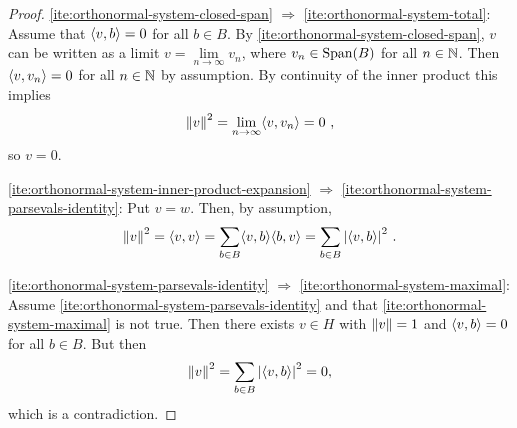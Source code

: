 \begin{proof}
  \ref{ite:orthonormal-system-closed-span}  $\Rightarrow$ \ref{ite:orthonormal-system-total}:
  Assume that $\langle v, b \rangle = 0$ for all $b \in B$. By \ref{ite:orthonormal-system-closed-span}, $v$ can be written as a limit 
  $v = \lim\limits_{n\to\infty} v_n$, where $v_n \in \operatorname{Span} (B)$ for all $n\in \mathbb{N}$. 
  Then  $\langle v, v_n \rangle = 0$ for all $n\in \mathbb{N}$ by assumption. 
  By continuity of the inner product this implies
  \[
     \left\|v\right\|^2 = \lim\limits_{n\to\infty} \langle v, v_n \rangle = 0 \ ,
  \]
  so $v=0$. 

  \ref{ite:orthonormal-system-inner-product-expansion} $\Rightarrow$ \ref{ite:orthonormal-system-parsevals-identity}: 
  Put $v = w$. Then, by assumption,
  \[
   \left\|v\right\|^2 = \langle v, v \rangle = \sum\limits_{b\in B} \langle v, b \rangle \langle b, v \rangle = \sum\limits_{b \in B} {\left|\langle v, b \rangle\right|}^2 \ .
  \]

  \ref{ite:orthonormal-system-parsevals-identity} $\Rightarrow$ \ref{ite:orthonormal-system-maximal}:
  Assume \ref{ite:orthonormal-system-parsevals-identity} and that \ref{ite:orthonormal-system-maximal} is not true. 
  Then there exists $v \in H$ with $\left\|v\right\| = 1$ and $\langle v, b \rangle = 0$ for all $b \in B$. But then
  \[
    \left\|v\right\|^2 = \sum_{b \in B} {\left|\langle v, b \rangle\right|}^2 = 0,
  \]
  which is a contradiction.

 
\end{proof}